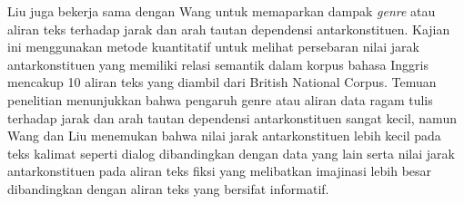 Liu juga bekerja sama dengan Wang \citep{wang2017effects} untuk memaparkan dampak \textit{genre} atau aliran teks terhadap jarak dan arah tautan dependensi antarkonstituen. Kajian ini menggunakan metode kuantitatif untuk melihat persebaran nilai jarak antarkonstituen yang memiliki relasi semantik dalam korpus bahasa Inggris mencakup 10 aliran teks yang diambil dari British National Corpus. Temuan penelitian menunjukkan bahwa pengaruh genre atau aliran data ragam tulis terhadap jarak dan arah tautan dependensi antarkonstituen sangat kecil, namun Wang dan Liu menemukan bahwa nilai jarak antarkonstituen lebih kecil pada teks kalimat seperti dialog dibandingkan dengan data yang lain serta nilai jarak antarkonstituen pada aliran teks fiksi yang melibatkan imajinasi lebih besar dibandingkan dengan aliran teks yang bersifat informatif.

